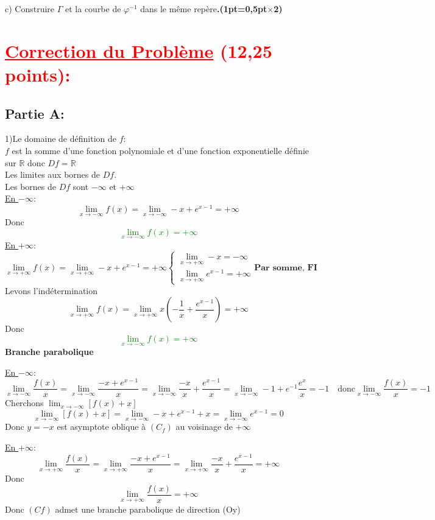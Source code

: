 \documentclass[12pt]{article}
\begin{document}
    c) Construire $\Gamma$ et la courbe de $\varphi^{-1}$  dans le même repère\textbf{.(1pt=0,5pt$\times$2)}
\section*{\textcolor{red}{\underline{Correction du Problème} (12,25 points):}}
\subsection*{Partie A:}
1)Le domaine de définition de $f$:\\
$f$ est la somme d'une fonction polynomiale et d'une fonction exponentielle définie sur $\mathbb{R}$ donc $Df=\mathbb{R}$\\
Les limites aux bornes de $Df$.\\
Les bornes de $Df$ sont $-\infty$ et $+\infty$\\
\underline{En $-\infty$}:
\[\lim_{x \to -\infty}f(x)=\lim_{x \to -\infty}-x+e^{x-1}=+\infty\]
Donc \textcolor{green}{\[\lim_{x \to -\infty}f(x)=+\infty\]}
\underline{En $+\infty$}:
\begin{equation*}
\lim_{x \to +\infty}f(x)=\lim_{x \to +\infty}-x+e^{x-1}=+\infty
\begin{cases}
\lim_{x \to +\infty} -x=-\infty\\
\lim_{x \to +\infty}e^{x-1}=+\infty
\end{cases}
\textbf{Par somme, FI}
\end{equation*}
Levons l'indétermination\\
\begin{equation*}
\lim_{x \to +\infty}f(x)=\lim_{x \to +\infty}x\left(-\frac{1}{x}+\frac{e^{x-1}}{x}\right)=+\infty
\end{equation*}
Donc \textcolor{green}{\[\lim_{x \to -\infty}f(x)=+\infty\]}
\textbf{Branche parabolique}
 
\underline{En $-\infty$}:
\begin{equation*}
\lim_{x \to -\infty}\frac{f(x)}{x}=\lim_{x \to -\infty}\frac{-x+e^{x-1}}{x}=\lim_{x \to -\infty}\frac{-x}{x}+\frac{e^{x-1}}{x}=\lim_{x \to -\infty}-1+e^{-1}\frac{e^{x}}{x}=-1
\quad\text{donc} \lim_{x \to -\infty}\frac{f(x)}{x}=-1
\end{equation*}
Cherchons $\lim_{x \to -\infty}\left[ f(x)+x\right] $
\[\lim_{x \to -\infty}\left[ f(x)+x\right]=\lim_{x \to -\infty}-x+e^{x-1}+x=\lim_{x \to -\infty}e^{x-1}=0\]
Donc $y=-x$ est asymptote oblique à $(C_{f})$ au voisinage de $+\infty$

\underline{En $+\infty$}:
\[\lim_{x \to +\infty}\frac{f(x)}{x}=\lim_{x \to +\infty}\frac{-x+e^{x-1}}{x}=\lim_{x \to +\infty}\frac{-x}{x}+\frac{e^{x-1}}{x}=+\infty\]
Donc \[\lim_{x \to +\infty}\frac{f(x)}{x}=+\infty\] Donc $(Cf)$ admet une branche parabolique de direction (Oy)
\end{document}
